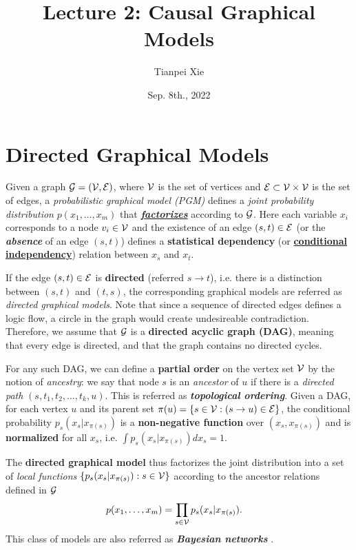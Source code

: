\documentclass[11pt]{article}
\begin{document}
\title{Lecture 2: Causal Graphical Models}
\author{ Tianpei Xie}
\date{Sep. 8th., 2022 }
\maketitle
\tableofcontents
\newpage
\allowdisplaybreaks
\section{Directed Graphical Models}
Given a graph ${\mathcal G} = ({\mathcal V}, {\mathcal E})$, where ${\mathcal V}$ is the set of vertices and ${\mathcal E} \subset {\mathcal V} \times {\mathcal V}$ is the set of edges, a \emph{probabilistic graphical model (PGM)} defines a \emph{joint probability distribution} $p(x_1, \ldots, x_{m})$ that \underline{\emph{\textbf{factorizes}}} according to ${\mathcal G}$. Here each variable $x_i$ corresponds to a node $v_i \in {\mathcal V}$ and the existence of an edge $(s,t) \in {\mathcal E}$ (or the \emph{\textbf{absence}} of an edge $(s,t)$) defines a \textbf{statistical dependency} (or \underline{\textbf{conditional independency}}) relation between $x_s$ and $x_t$.  

If the edge $(s, t) \in {\mathcal E}$ is \textbf{directed} (referred $s\rightarrow t$), i.e. there is a distinction between $(s, t)$ and $(t, s)$, the corresponding graphical models are referred as \emph{{directed graphical models}}.  Note that since a sequence of directed edges defines a logic flow, a circle in the graph would create undesireable contradiction. Therefore, we assume that ${\mathcal G}$ is a \textbf{directed acyclic graph (DAG)}, meaning
that every edge is directed, and that the graph contains no directed cycles. 

For any such DAG, we can define a \textbf{partial order} on the vertex set ${\mathcal V}$ by the notion of \emph{ancestry}:  we say that node $s$ is an \emph{ancestor} of $u$ if there is a \emph{directed path} $(s,t_1,t_2,\ldots,t_k,u)$. This is referred as \textbf{\emph{topological ordering}}. Given a DAG, for each vertex $u$ and its parent set $\pi(u) = \left\{s \in {\mathcal V}: (s\rightarrow u) \in {\mathcal E} \right\}$, the conditional probability $p_s(x_s | x_{\pi(s)})$ is a \textbf{non-negative function} over $ (x_s, x_{\pi(s)})$ and is \textbf{normalized} for all $x_s$, i.e. $\int p_s(x_s | x_{\pi(s)}) dx_s = 1.$

The \textbf{directed graphical model} thus factorizes the joint distribution into a set of \emph{local functions} $\{p_s(x_s | x_{\pi(s)}): s\in {\mathcal V}\}$ according to the ancestor relations defined in ${\mathcal G}$
\begin{align}
p(x_1, \ldots, x_{m}) &= \prod_{s \in {\mathcal V}}p_s(x_s | x_{\pi(s)}). \label{eqn: dag_graph_factorization}
\end{align} This class of models are also referred as \emph{\textbf{Bayesian networks}} \citep{koller2009probabilistic}.
\end{document}
